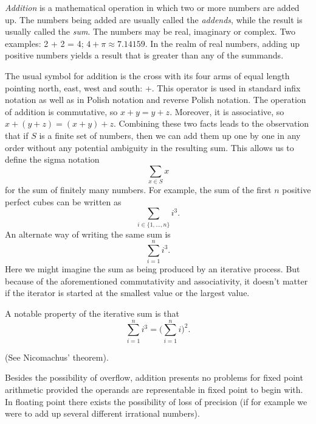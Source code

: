 \documentclass[12pt]{article}
\begin{document}
{\em Addition} is a mathematical operation in which two or more numbers are added up. The numbers being added are usually called the \emph{addends}, while the result is usually called the \emph{sum}.  The numbers may be real, imaginary or complex. Two examples: 2 + 2 = 4; $4 + \pi \approx 7.14159$. In the realm of real numbers, adding up positive numbers yields a result that is greater than any of the summands.

The usual symbol for addition is the cross with its four arms of equal length pointing north, east, west and south: +. This operator is used in standard infix notation as well as in Polish notation and reverse Polish notation.  The operation of addition is commutative, so $x + y = y + z$.  Moreover, it is associative, so $x + (y + z) = (x + y) + z$.  
Combining these two facts leads to the observation that if $S$ is a finite set of numbers, then we can add them up one by one in any order without any potential ambiguity in the resulting sum.  This allows us to define the sigma notation 
\[
\sum_{x\in S} x
\] 
for the sum of finitely many numbers.  For example, the sum of the first $n$ positive perfect cubes can be written as
\[
\sum_{i\in\{1,\dots,n\}} i^3.
\]
An alternate way of writing the same sum is
\[
\sum_{i=1}^n i^3.
\]
Here we might imagine the sum as being produced by an iterative process.  But because of the aforementioned commutativity and associativity, it doesn't matter if the iterator is started at the smallest value or the largest value.

A notable property of the iterative sum is that 
\[
\sum_{i = 1}^n i^3 = \biggl(\sum_{i = 1}^n i\biggr)^2.
\]

(See Nicomachus' theorem).

Besides the possibility of overflow, addition presents no problems for fixed point arithmetic provided the operands are representable in fixed point to begin with. In floating point there exists the possibility of loss of precision (if for example we were to add up several different irrational numbers).

\end{document}

